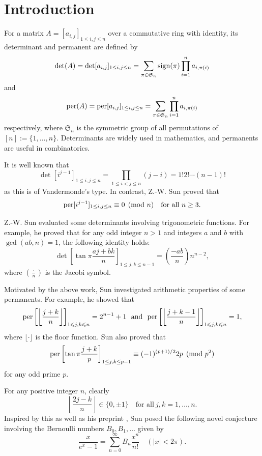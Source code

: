 \documentclass[11pt,reqno]{amsart}
\numberwithin{equation}{section}
\theoremstyle{plain}
\theoremstyle{definition}
\renewcommand{\S}{\mathfrak{S}}
\def\per{\mathrm{per}}
\def\sign{{\rm sign}}
\def\l{\left}
\def\r{\right}
\def\t{\text}
\def\f{\frac}
\def\per{{\rm per}}
\def\ls{\leqslant}
\def\eq{\equiv}
\begin{document}

\maketitle
\section{Introduction}

For a matrix $A=[a_{i,j}]_{1\le i,j\le n}$ over a commutative ring with identity, its determinant and permanent are defined by
$$\det(A)=\det[a_{i,j}]_{1\le i,j\le n}=\sum_{\pi\in\S_n}\sign(\pi)\prod_{i=1}^n a_{i,\pi(i)}$$
and
$$\per(A)=\per[a_{i,j}]_{1\le i,j\le n}=\sum_{\pi\in\S_n}\prod_{i=1}^n a_{i,\pi(i)}$$
respectively, where $\S_n$ is the symmetric group of all permutations of $[n]:=\{1,\ldots,n\}$.
Determinants are widely used in mathematics, and permanents are useful in combinatorics.

It is well known that
$$\det[i^{j-1}]_{1\le i,j\le n}=\prod_{1\le i<j\le n}(j-i)=1!2!\cdots(n-1)!$$
as this is of Vandermonde's type. In contrast, Z.-W. Sun \cite{S18} proved that
$$\per[i^{j-1}]_{1\le i,j\le n}\eq0\pmod n\quad\t{for all}\ n\ge 3.$$

Z.-W. Sun \cite{S19} evaluated some determinants involving trigonometric functions.
For example, he proved that for any odd integer $n>1$ and integers $a$ and $b$ with $\gcd(ab,n)=1$, the following identity holds:
$$\det\l[\tan\pi\f{aj+bk}n\r]_{1\ls j,k\ls n-1}=\l(\f{-ab}n\r)n^{n-2},$$
where $(\f{\cdot}n)$ is the Jacobi symbol.

Motivated by the above work, Sun \cite{Sun} investigated arithmetic properties of some permanents.
For example, he showed that
\begin{equation}\label{(j+k)/n}
\per\l[\l\lfloor\f{j+k}n\r\rfloor\r]_{1\ls j,k\ls n}=2^{n-1}+1
\ \ \t{and}\ \ \per\l[\l\lfloor\f{j+k-1}n\r\rfloor\r]_{1\ls j,k\ls n}=1,
\end{equation}
where $\lfloor\cdot\rfloor$ is the floor function. Sun \cite{Sun} also proved that
$$\per\l[\tan\pi\f{j+k}p\r]_{1\le j,k\le p-1}\eq(-1)^{(p+1)/2}2p\pmod{p^2}$$
for any odd prime $p$.

For any positive integer $n$, clearly
$$\l\lfloor\f{2j-k}n\r\rfloor\in\{0,\pm1\}\quad\t{for all}\ j,k=1,\ldots,n.$$
Inspired by this as well as his preprint \cite{Sun},
Sun \cite{Sun-quest} posed the following novel conjecture involving the Bernoulli numbers $B_0,B_1,\ldots$ given by
$$\frac{x}{e^x-1}=\sum_{n=0}^{\infty}B_n\frac{x^n}{n!}\quad (|x|<2\pi).$$
\end{document}
